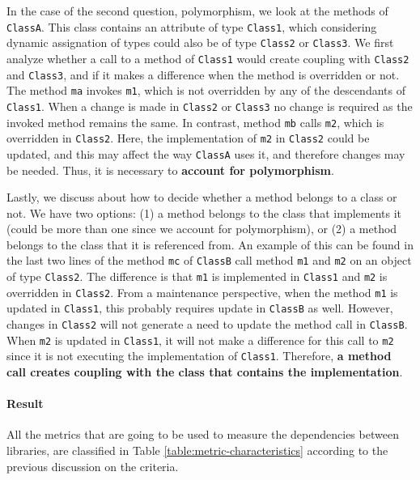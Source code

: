 In the case of the second question, polymorphism, we look at the methods of \texttt{ClassA}. This class contains an attribute of type \texttt{Class1}, which considering dynamic assignation of types could also be of type \texttt{Class2} or \texttt{Class3}.
We first analyze whether a call to a method of \texttt{Class1} would create coupling with \texttt{Class2} and \texttt{Class3}, and if it makes a difference when the method is overridden or not. The method \texttt{ma} invokes \texttt{m1}, which is not overridden by any of the descendants of \texttt{Class1}. When a change is made in \texttt{Class2} or \texttt{Class3} no change is required as the invoked method remains the same. In contrast, method \texttt{mb} calls \texttt{m2}, which is overridden in \texttt{Class2}. Here, the implementation of \texttt{m2} in \texttt{Class2} could be updated, and this may affect the way \texttt{ClassA} uses it, and therefore changes may be needed. Thus, it is necessary to \textbf{account for polymorphism}.

Lastly, we discuss about how to decide whether a method belongs to a class or not. We have two options: (1) a method belongs to the class that implements it (could be more than one since we account for polymorphism), or (2) a method belongs to the class that it is referenced from. An example of this can be found in the last two lines of the method \texttt{mc} of \texttt{ClassB} call method \texttt{m1} and \texttt{m2} on an object of type \texttt{Class2}. The difference is that \texttt{m1} is implemented in \texttt{Class1} and \texttt{m2} is overridden in \texttt{Class2}. From a maintenance perspective, when the method \texttt{m1} is updated in \texttt{Class1}, this probably requires update in \texttt{ClassB} as well. However, changes in \texttt{Class2} will not generate a need to update the method call in \texttt{ClassB}. When  \texttt{m2} is updated in \texttt{Class1}, it will not make a difference for this call to \texttt{m2} since it is not executing the implementation of \texttt{Class1}. Therefore, \textbf{a method call creates coupling with the class that contains the implementation}.

\paragraph{Result}
All the metrics that are going to be used to measure the dependencies between libraries, are classified in Table \ref{table:metric-characteristics} according to the previous discussion on the criteria.

